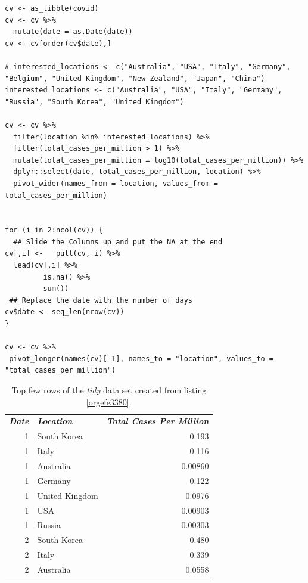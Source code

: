 \documentclass[11pt]{article}
\begin{document}
\begin{listing}[htbp]
\begin{verbatim}
cv <- as_tibble(covid)
cv <- cv %>%
  mutate(date = as.Date(date))
cv <- cv[order(cv$date),]

# interested_locations <- c("Australia", "USA", "Italy", "Germany", "Belgium", "United Kingdom", "New Zealand", "Japan", "China")
interested_locations <- c("Australia", "USA", "Italy", "Germany", "Russia", "South Korea", "United Kingdom")

cv <- cv %>%
  filter(location %in% interested_locations) %>%
  filter(total_cases_per_million > 1) %>%
  mutate(total_cases_per_million = log10(total_cases_per_million)) %>%
  dplyr::select(date, total_cases_per_million, location) %>%
  pivot_wider(names_from = location, values_from = total_cases_per_million)


for (i in 2:ncol(cv)) {
  ## Slide the Columns up and put the NA at the end
cv[,i] <-   pull(cv, i) %>%
  lead(cv[,i] %>%
         is.na() %>%
         sum())
 ## Replace the date with the number of days
cv$date <- seq_len(nrow(cv))
}

cv <- cv %>%
 pivot_longer(names(cv)[-1], names_to = "location", values_to = "total_cases_per_million")
\end{verbatim}
\caption{\label{orgefe3380}Use \texttt{dplyr} to transform the data as shown in table \ref{tab:org5415f93}, this can then be passed to ggplot as shown in listing \ref{orgba8ada1}}
\end{listing}

\begin{table}[htbp]
\caption{\label{tab:org5415f93}Top few rows of the \emph{tidy} data set created from listing \ref{orgefe3380}.}
\centering
\begin{tabular}{rlr}
\emph{\textbf{Date}} & \emph{\textbf{Location}} & \emph{\textbf{Total Cases Per Million}}\\
1 & South Korea & 0.193\\
1 & Italy & 0.116\\
1 & Australia & 0.00860\\
1 & Germany & 0.122\\
1 & United Kingdom & 0.0976\\
1 & USA & 0.00903\\
1 & Russia & 0.00303\\
2 & South Korea & 0.480\\
2 & Italy & 0.339\\
2 & Australia & 0.0558\\
\end{tabular}
\end{table}
\end{document}
